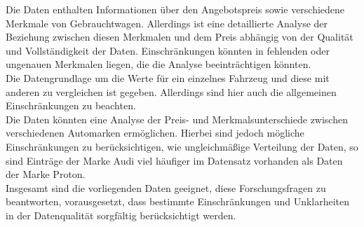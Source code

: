 Die Daten enthalten Informationen über den Angebotspreis sowie verschiedene Merkmale von Gebrauchtwagen. Allerdings ist eine detaillierte Analyse der Beziehung zwischen diesen Merkmalen und dem Preis abhängig von der Qualität und Vollständigkeit der Daten. Einschränkungen könnten in fehlenden oder ungenauen Merkmalen liegen, die die Analyse beeinträchtigen könnten. \\

Die Datengrundlage um die Werte für ein einzelnes Fahrzeug und diese mit anderen zu vergleichen ist gegeben. Allerdings sind hier auch die allgemeinen Einschränkungen zu beachten. \\

Die Daten könnten eine Analyse der Preis- und Merkmalsunterschiede zwischen verschiedenen Automarken ermöglichen. Hierbei sind jedoch mögliche Einschränkungen zu berücksichtigen, wie ungleichmäßige Verteilung der Daten, so sind Einträge der Marke Audi viel häufiger im Datensatz vorhanden als Daten der Marke Proton. \\

Insgesamt sind die vorliegenden Daten geeignet, diese Forschungsfragen zu beantworten, vorausgesetzt, dass bestimmte Einschränkungen und Unklarheiten in der Datenqualität sorgfältig berücksichtigt werden. \\
